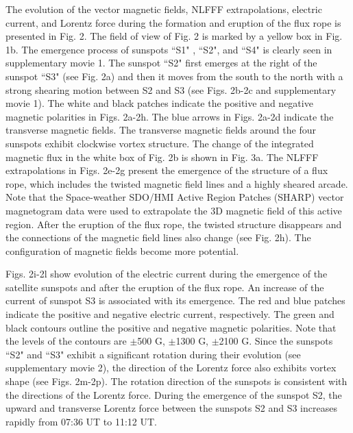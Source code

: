 \documentclass[12pt,preprint]{aastex}
\begin{document}
\begin{CJK*}{UTF8}{gbsn}
The evolution of the vector magnetic fields, NLFFF extrapolations, electric current, and Lorentz force during the formation and eruption of the flux rope is presented in Fig. 2. The field of view of Fig. 2 is marked by a yellow box in Fig. 1b. The emergence process of sunspots ``S1" , ``S2", and ``S4" is clearly seen in supplementary movie 1. The sunspot ``S2" first emerges at the right of the sunspot ``S3" (see Fig. 2a) and then it moves from the south to the north with a strong shearing motion between S2 and S3 (see Figs. 2b-2c and supplementary movie 1).  The white and black patches indicate the positive and negative magnetic polarities in Figs. 2a-2h. The blue arrows in Figs. 2a-2d indicate the transverse magnetic fields. The transverse magnetic fields around the four sunspots exhibit clockwise vortex structure. The change of the integrated magnetic flux in the white box of Fig. 2b is shown in Fig. 3a. The NLFFF extrapolations in Figs. 2e-2g present the emergence of the structure of a flux rope, which includes the twisted magnetic field lines and a highly sheared arcade. Note that the Space-weather SDO/HMI Active Region Patches (SHARP) vector magnetogram data were used to extrapolate the 3D magnetic field of this active region. After the eruption of the flux rope, the twisted structure disappears and the connections of the magnetic field lines also change (see Fig. 2h). The configuration of magnetic fields become more potential. 

Figs. 2i-2l show evolution of the electric current during the emergence of the satellite sunspots and after the eruption of the flux rope. An increase of the current of sunspot S3 is associated with its emergence. The red and blue patches indicate the positive and negative electric current, respectively. The green and black contours outline the positive and negative magnetic polarities. Note that the levels of the contours are $\pm$500 G,  $\pm$1300 G, $\pm$2100 G. Since the sunspots ``S2" and ``S3" exhibit a significant rotation during their evolution (see supplementary movie 2), the direction of the Lorentz force also exhibits vortex shape (see Figs. 2m-2p). The rotation direction of the sunspots is consistent with the directions of the Lorentz force. During the emergence of the sunspot S2, the upward and transverse Lorentz force between the sunspots S2 and S3 increases rapidly from 07:36 UT to 11:12 UT.


\end{CJK*}
\end{document}
